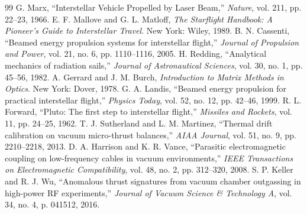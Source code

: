 \documentclass[journal,10pt,twoside]{IEEEtran}
\begin{document}
\begin{thebibliography}{99}
 G. Marx, ``Interstellar Vehicle Propelled by Laser Beam,'' \textit{Nature}, vol. 211, pp. 22--23, 1966.
 E. F. Mallove and G. L. Matloff, \textit{The Starflight Handbook: A Pioneer's Guide to Interstellar Travel}. New York: Wiley, 1989.
 B. N. Cassenti, ``Beamed energy propulsion systems for interstellar flight,'' \textit{Journal of Propulsion and Power}, vol. 21, no. 6, pp. 1110--1116, 2005.
 H. Redding, ``Analytical mechanics of radiation sails,'' \textit{Journal of Astronautical Sciences}, vol. 30, no. 1, pp. 45--56, 1982.
 A. Gerrard and J. M. Burch, \textit{Introduction to Matrix Methods in Optics}. New York: Dover, 1978.
 G. A. Landis, ``Beamed energy propulsion for practical interstellar flight,'' \textit{Physics Today}, vol. 52, no. 12, pp. 42--46, 1999.
 R. L. Forward, ``Pluto: The first step to interstellar flight,'' \textit{Missiles and Rockets}, vol. 11, pp. 24--25, 1962.
 T. J. Sutherland and L. M. Martinez, ``Thermal drift calibration on vacuum micro-thrust balances,'' \textit{AIAA Journal}, vol. 51, no. 9, pp. 2210--2218, 2013.
 D. A. Harrison and K. R. Vance, ``Parasitic electromagnetic coupling on low-frequency cables in vacuum environments,'' \textit{IEEE Transactions on Electromagnetic Compatibility}, vol. 48, no. 2, pp. 312--320, 2008.
 S. P. Keller and R. J. Wu, ``Anomalous thrust signatures from vacuum chamber outgassing in high-power RF experiments,'' \textit{Journal of Vacuum Science \& Technology A}, vol. 34, no. 4, p. 041512, 2016.
\end{thebibliography}
\end{document}
